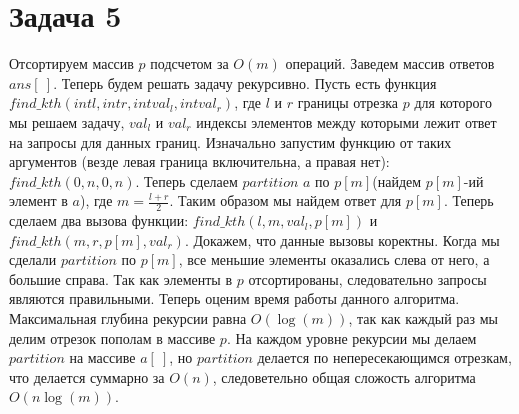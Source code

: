 \documentclass{article}
\begin{document}
	\section*{Задача 5}
	Отсортируем массив $p$ подсчетом за $O(m)$ операций. Заведем массив ответов $ans[\ ]$. Теперь будем решать задачу рекурсивно. Пусть есть функция $find\_kth(int l, int r, int val_l, int val_r)$, где $l$ и $r$ границы отрезка $p$ для которого мы решаем задачу, $val_l$ и $val_r$ индексы элементов между которыми лежит ответ на запросы для данных границ. Изначально запустим функцию от таких аргументов (везде левая граница включительна, а правая нет): $find\_kth(0, n, 0, n)$. Теперь сделаем $partition$ $a$ по $p[m]$(найдем $p[m]$-ий элемент в $a$), где $m = \frac{l + r}{2}$. Таким образом мы найдем ответ для $p[m]$. Теперь сделаем два вызова функции: $find\_kth(l, m, val_l, p[m])$ и $find\_kth(m, r, p[m], val_r)$. Докажем, что данные вызовы коректны. Когда мы сделали $partition$ по $p[m]$, все меньшие элементы оказались слева от него, а большие справа. Так как элементы в $p$ отсортированы, следовательно запросы являются правильными. Теперь оценим время работы данного алгоритма. Максимальная глубина рекурсии равна $O(\log(m))$, так как каждый раз мы делим отрезок пополам в массиве $p$. На каждом уровне рекурсии мы делаем $partition$ на массиве $a[\ ]$, но $partition$ делается по непересекающимся отрезкам, что делается суммарно за $O(n)$, следоветельно общая сложость алгоритма $O(n\log(m))$.
	
\end{document}
